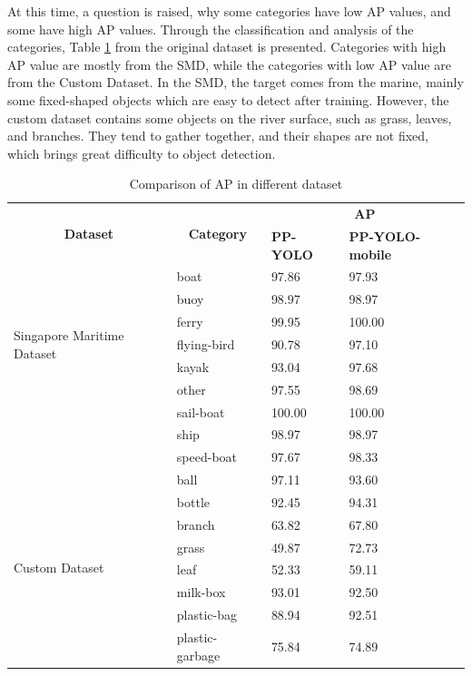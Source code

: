 \documentclass[journal,article,submit,moreauthors,pdftex]{Definitions/mdpi}
\begin{document}
At this time, a question is raised, why some categories have low AP values, and some have high AP values. Through the classification and analysis of the categories, Table \ref{tbl:Comparison of AP in different dataset} from the original dataset is presented. Categories with high AP value are mostly from the SMD, while the categories with low AP value are from the Custom Dataset. In the SMD, the target comes from the marine, mainly some fixed-shaped objects which are easy to detect after training. However, the custom dataset contains some objects on the river surface, such as grass, leaves, and branches. They tend to gather together, and their shapes are not fixed, which brings great difficulty to object detection.

\begin{table}[htbp]
\centering
\caption{Comparison of AP in different dataset}
\begin{tabular}{llll} 
\toprule

\multicolumn{1}{c}{\multirow{2}{*}{\textbf{Dataset}}} &
\multicolumn{1}{c}{\multirow{2}{*}{\textbf{Category}}} &\multicolumn{2}{c}{\textbf{AP}} \\
\cmidrule(l){3-4} 
&& \textbf{PP-YOLO} & \textbf{PP-YOLO-mobile} \\

\midrule
\multirow{7}{*}{Singapore Maritime Dataset} 
& boat& 97.86  & 97.93  \\
& buoy & 98.97 & 98.97 \\
& ferry & 99.95 & 100.00 \\
& flying-bird & 90.78 & 97.10 \\
& kayak & 93.04 & 97.68 \\
& other & 97.55 & 98.69 \\
& sail-boat & 100.00 & 100.00 \\
& ship & 98.97 & 98.97 \\
& speed-boat & 97.67 & 98.33 \\
\cmidrule(r){1-4}

\multirow{8}{*}{Custom Dataset} 
& ball& 97.11  & 93.60 \\
& bottle & 92.45 & 94.31  \\
& branch & 63.82 & 67.80 \\
& grass & 49.87 & 72.73  \\
& leaf & 52.33 & 59.11 \\
& milk-box  & 93.01 & 92.50 \\
& plastic-bag & 88.94 & 92.51 \\
& plastic-garbage & 75.84 & 74.89 \\

\bottomrule
\end{tabular}
\label{tbl:Comparison of AP in different dataset}
\end{table}
\end{document}
